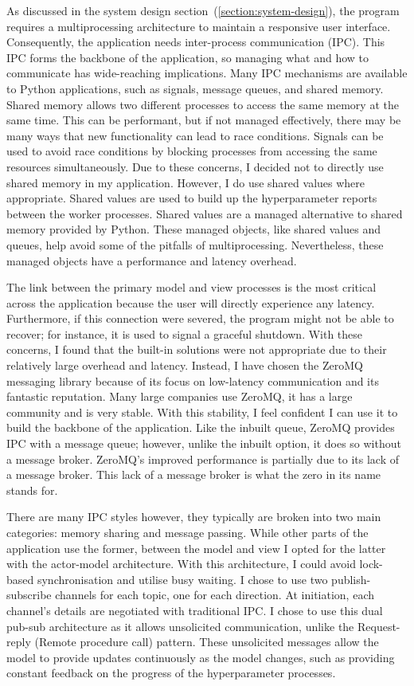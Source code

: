\documentclass[]{final_report}
\begin{document}
As discussed in the system design section~(\ref{section:system-design}), the program requires a multiprocessing architecture to maintain a responsive user interface. Consequently, the application needs inter-process communication (IPC). This IPC forms the backbone of the application, so managing what and how to communicate has wide-reaching implications. Many IPC mechanisms are available to Python applications, such as signals, message queues, and shared memory. Shared memory allows two different processes to access the same memory at the same time. This can be performant, but if not managed effectively, there may be many ways that new functionality can lead to race conditions. Signals can be used to avoid race conditions by blocking processes from accessing the same resources simultaneously. Due to these concerns, I decided not to directly use shared memory in my application. However, I do use shared values where appropriate. Shared values are used to build up the hyperparameter reports between the worker processes. Shared values are a managed alternative to shared memory provided by Python. These managed objects, like shared values and queues, help avoid some of the pitfalls of multiprocessing. Nevertheless, these managed objects have a performance and latency overhead. 

The link between the primary model and view processes is the most critical across the application because the user will directly experience any latency. Furthermore, if this connection were severed, the program might not be able to recover; for instance, it is used to signal a graceful shutdown. With these concerns, I found that the built-in solutions were not appropriate due to their relatively large overhead and latency. Instead, I have chosen the ZeroMQ messaging library because of its focus on low-latency communication and its fantastic reputation. Many large companies use ZeroMQ, it has a large community and is very stable. With this stability, I feel confident I can use it to build the backbone of the application. Like the inbuilt queue, ZeroMQ provides IPC with a message queue; however, unlike the inbuilt option, it does so without a message broker.  ZeroMQ's improved performance is partially due to its lack of a message broker. This lack of a message broker is what the zero in its name stands for.

There are many IPC styles however, they typically are broken into two main categories: memory sharing and message passing. While other parts of the application use the former, between the model and view I opted for the latter with the actor-model architecture. With this architecture, I could avoid lock-based synchronisation and utilise busy waiting. I chose to use two publish-subscribe channels for each topic, one for each direction. At initiation, each channel's details are negotiated with traditional IPC. I chose to use this dual pub-sub architecture as it allows unsolicited communication, unlike the Request-reply (Remote procedure call) pattern. These unsolicited messages allow the model to provide updates continuously as the model changes, such as providing constant feedback on the progress of the hyperparameter processes. 
\end{document}
